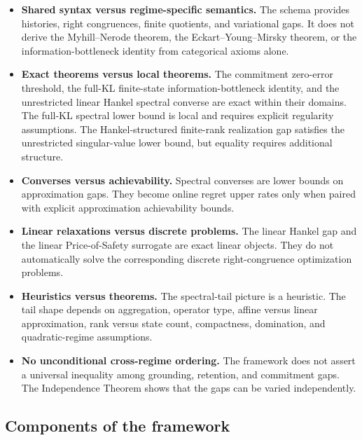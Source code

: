 \documentclass[12pt]{article}
\theoremstyle{definition}
\begin{document}
\begin{itemize}[leftmargin=2.0em]
\item \textbf{Shared syntax versus regime-specific semantics.}
The schema provides histories, right congruences, finite quotients, and
variational gaps.  It does not derive the Myhill--Nerode theorem, the
Eckart--Young--Mirsky theorem, or the information-bottleneck identity from
categorical axioms alone.

\item \textbf{Exact theorems versus local theorems.}
The commitment zero-error threshold, the full-KL finite-state
information-bottleneck identity, and the unrestricted linear Hankel spectral
converse are exact within their domains.  The full-KL spectral lower bound is
local and requires explicit regularity assumptions.  The Hankel-structured
finite-rank realization gap satisfies the unrestricted singular-value lower
bound, but equality requires additional structure.

\item \textbf{Converses versus achievability.}
Spectral converses are lower bounds on approximation gaps.  They become
online regret upper rates only when paired with explicit approximation
achievability bounds.

\item \textbf{Linear relaxations versus discrete problems.}
The linear Hankel gap and the linear Price-of-Safety surrogate are exact
linear objects.  They do not automatically solve the corresponding discrete
right-congruence optimization problems.

\item \textbf{Heuristics versus theorems.}
The spectral-tail picture is a heuristic.  The tail shape depends on
aggregation, operator type, affine versus linear approximation, rank versus
state count, compactness, domination, and quadratic-regime assumptions.

\item \textbf{No unconditional cross-regime ordering.}
The framework does not assert a universal inequality among grounding,
retention, and commitment gaps.  The Independence Theorem shows that the
gaps can be varied independently.
\end{itemize}

\subsection{Components of the framework}
\label{subsec:integrated-components-intro}
\end{document}
